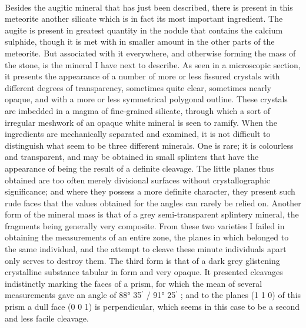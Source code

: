 \documentclass[a4paper, 12pt, oneside]{article}
\begin{document}
\paragraph{}
Besides the augitic mineral that has just been described, there is present in this meteorite another silicate which is in fact its most important ingredient. The augite is present in greatest quantity in the nodule that contains the calcium sulphide, though it is met with in smaller amount in the other parts of the meteorite. But associated with it everywhere, and otherwise forming the mass of the stone, is the mineral I have next to describe. As seen in a microscopic section, it presents the appearance of a number of more or less fissured crystals with different degrees of transparency, sometimes quite clear, sometimes nearly opaque, and with a more or less symmetrical polygonal outline. These crystals are imbedded in a magma of fine-grained silicate, through which a sort of irregular meshwork of an opaque white mineral is seen to ramify. When the ingredients are mechanically separated and examined, it is not difficult to distinguish what seem to be three different minerals. One is rare; it is colourless and transparent, and may be obtained in small splinters that have the appearance of being the result of a definite cleavage. The little planes thus obtained are too often merely divisional surfaces without crystallographic significance; and where they possess a more definite character, they present such rude faces that the values obtained for the angles can rarely be relied on. Another form of the mineral mass is that of a grey semi-transparent splintery mineral, the fragments being generally very composite. From these two varieties I failed in obtaining the measurements of an entire zone, the planes in which belonged to the same individual, and the attempt to cleave these minute individuals apart only serves to destroy them. The third form is that of a dark grey glistening crystalline substance tabular in form and very opaque. It presented cleavages indistinctly marking the faces of a prism, for which the mean of several measurements gave an angle of { 88° 35$^{\prime}$ / 91° 25$^{\prime}$ }; and to the planes (1 1 0) of this prism a dull face (0 0 1) is perpendicular, which seems in this case to be a second and less facile cleavage.
\end{document}
